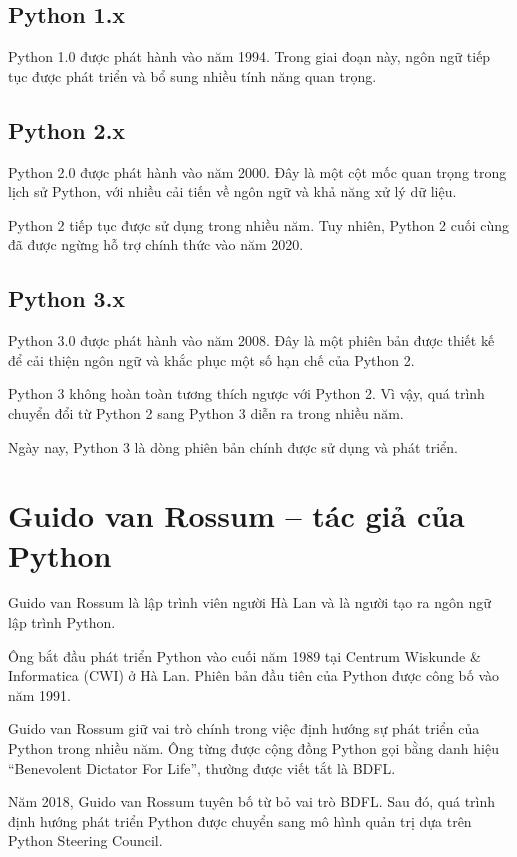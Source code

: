 \subsection{Python 1.x}

Python 1.0 được phát hành vào năm 1994. Trong giai đoạn này, ngôn ngữ
tiếp tục được phát triển và bổ sung nhiều tính năng quan trọng.

\subsection{Python 2.x}

Python 2.0 được phát hành vào năm 2000. Đây là một cột mốc quan trọng
trong lịch sử Python, với nhiều cải tiến về ngôn ngữ và khả năng xử lý
dữ liệu.

Python 2 tiếp tục được sử dụng trong nhiều năm. Tuy nhiên, Python 2
cuối cùng đã được ngừng hỗ trợ chính thức vào năm 2020.

\subsection{Python 3.x}

Python 3.0 được phát hành vào năm 2008. Đây là một phiên bản được
thiết kế để cải thiện ngôn ngữ và khắc phục một số hạn chế của Python 2.

Python 3 không hoàn toàn tương thích ngược với Python 2. Vì vậy, quá
trình chuyển đổi từ Python 2 sang Python 3 diễn ra trong nhiều năm.

Ngày nay, Python 3 là dòng phiên bản chính được sử dụng và phát triển.

\section{Guido van Rossum -- tác giả của Python}

Guido van Rossum là lập trình viên người Hà Lan và là người tạo ra
ngôn ngữ lập trình Python.

Ông bắt đầu phát triển Python vào cuối năm 1989 tại Centrum Wiskunde
\& Informatica (CWI) ở Hà Lan. Phiên bản đầu tiên của Python được công
bố vào năm 1991.

Guido van Rossum giữ vai trò chính trong việc định hướng sự phát triển
của Python trong nhiều năm. Ông từng được cộng đồng Python gọi bằng
danh hiệu ``Benevolent Dictator For Life'', thường được viết tắt là
BDFL.

Năm 2018, Guido van Rossum tuyên bố từ bỏ vai trò BDFL. Sau đó, quá
trình định hướng phát triển Python được chuyển sang mô hình quản trị
dựa trên Python Steering Council.

